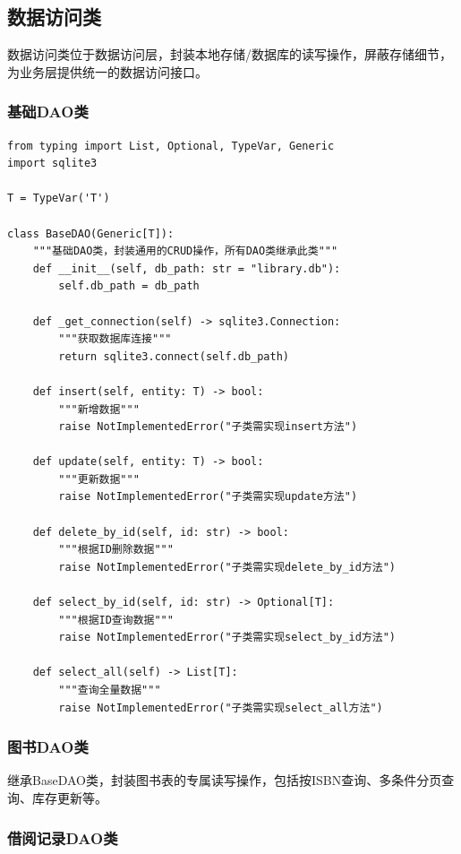\documentclass[12pt, a4paper]{article}
\begin{document}
\subsection{数据访问类}

数据访问类位于数据访问层，封装本地存储/数据库的读写操作，屏蔽存储细节，为业务层提供统一的数据访问接口。

\subsubsection{基础DAO类}
\begin{verbatim}
from typing import List, Optional, TypeVar, Generic
import sqlite3

T = TypeVar('T')

class BaseDAO(Generic[T]):
    """基础DAO类，封装通用的CRUD操作，所有DAO类继承此类"""
    def __init__(self, db_path: str = "library.db"):
        self.db_path = db_path

    def _get_connection(self) -> sqlite3.Connection:
        """获取数据库连接"""
        return sqlite3.connect(self.db_path)

    def insert(self, entity: T) -> bool:
        """新增数据"""
        raise NotImplementedError("子类需实现insert方法")

    def update(self, entity: T) -> bool:
        """更新数据"""
        raise NotImplementedError("子类需实现update方法")

    def delete_by_id(self, id: str) -> bool:
        """根据ID删除数据"""
        raise NotImplementedError("子类需实现delete_by_id方法")

    def select_by_id(self, id: str) -> Optional[T]:
        """根据ID查询数据"""
        raise NotImplementedError("子类需实现select_by_id方法")

    def select_all(self) -> List[T]:
        """查询全量数据"""
        raise NotImplementedError("子类需实现select_all方法")
\end{verbatim}

\subsubsection{图书DAO类}

继承BaseDAO类，封装图书表的专属读写操作，包括按ISBN查询、多条件分页查询、库存更新等。

\subsubsection{借阅记录DAO类}
\end{document}
